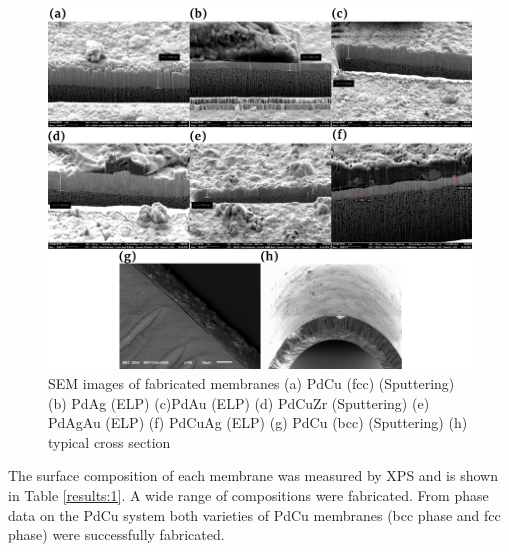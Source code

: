 \begin{figure}
    \centering
    \includegraphics[width=\linewidth, height=0.9\textheight,keepaspectratio]{figures/Semxsect.png}
    \caption{SEM images of fabricated membranes (a) PdCu (fcc) (Sputtering) (b) PdAg (ELP) (c)PdAu (ELP) (d) PdCuZr (Sputtering) (e) PdAgAu (ELP) (f) PdCuAg (ELP) (g) PdCu (bcc) (Sputtering) (h) typical cross section}
    \label{fig:1}
\end{figure}

The surface composition of each membrane was measured by XPS and is shown in Table \ref{results:1}. A wide range of compositions were fabricated. From phase data on the PdCu system \cite{Roa2003, Nayebossadri2013} both varieties of PdCu membranes (bcc phase and fcc phase) were successfully fabricated. 


